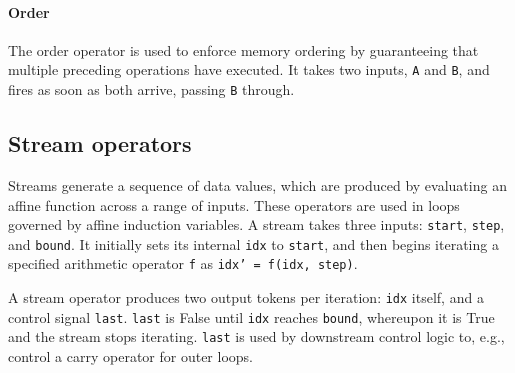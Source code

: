 \paragraph{Order}
The order operator is used to enforce memory ordering by guaranteeing that multiple preceding operations have executed.
% 
It takes two inputs, {\tt A} and {\tt B}, and fires as soon as both arrive, passing {\tt B} through.

\subsection{Stream operators}
\label{cf:streams}
Streams generate a sequence of data values, which are 
produced by evaluating an affine function
across a range of inputs. 
%
These operators are used in loops
governed by affine induction variables.
%
A stream takes three inputs: {\tt start}, {\tt step}, and {\tt bound}.
It initially sets its internal {\tt idx} to {\tt start},
%
and then begins iterating a specified arithmetic operator {\tt f}
as \mbox{\tt idx' = f(idx, step)}.

A stream operator produces two output tokens per iteration: {\tt idx} itself,
and a control signal {\tt last}.
%
{\tt last} is False until {\tt idx} reaches {\tt bound},
whereupon it is True and the stream stops iterating.
%
{\tt last} is used by downstream control logic to, e.g., control
a carry operator for outer loops.
